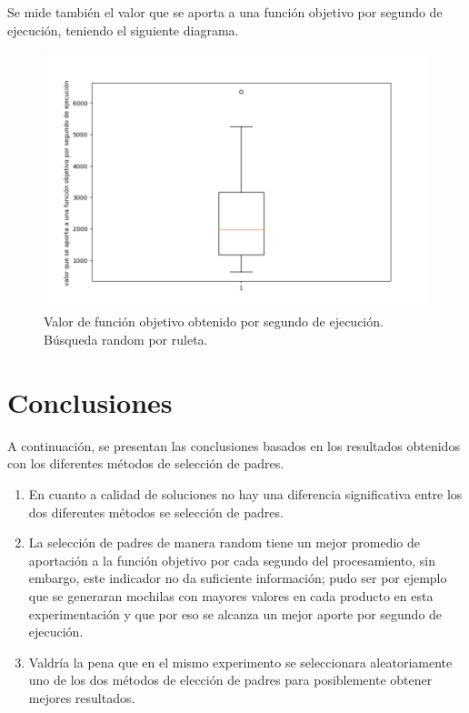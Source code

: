 \documentclass{article}
\begin{document}
    	Se mide también el valor que se aporta a una función objetivo por segundo de ejecución, teniendo el siguiente diagrama.\\
    	
    	\begin{figure}[h!]
    		\centering
    		\includegraphics[width=0.7\linewidth]{Figure_4.png}
    		\caption{Valor de función objetivo obtenido por segundo de ejecución. Búsqueda random por ruleta.}
    		\label{fig:imagen4}
    	\end{figure}
    
    \section{Conclusiones}
    A continuación, se presentan las conclusiones basados en los resultados obtenidos con los diferentes métodos de selección de padres.
    \begin{enumerate}
    	\item	En cuanto a calidad de soluciones no hay una diferencia significativa entre los dos diferentes métodos se selección de padres.
    	\item	La selección de padres de manera random tiene un mejor promedio de aportación a la función objetivo por cada segundo del procesamiento, sin embargo, este indicador no da suficiente información; pudo ser por ejemplo que se generaran mochilas con mayores valores en cada producto en esta experimentación y que por eso se alcanza un mejor aporte por segundo de ejecución. 
    	\item	Valdría la pena que en el mismo experimento se seleccionara aleatoriamente uno de los dos métodos de elección de padres para posiblemente obtener mejores resultados. 
    	
    \end{enumerate}




    
\end{document}
